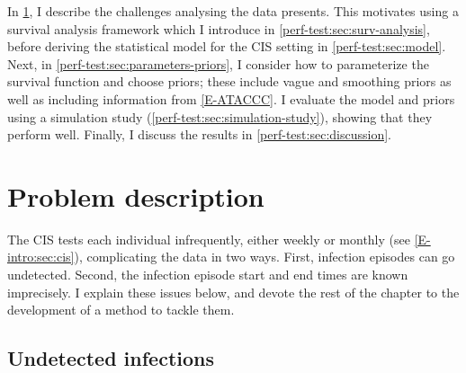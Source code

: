 \documentclass[thesis.tex]{subfiles}
\begin{document}
In \cref{perf-test:sec:problem}, I describe the challenges analysing the data presents.
This motivates using a survival analysis framework which I introduce in \cref{perf-test:sec:surv-analysis}, before deriving the statistical model for the CIS setting in \cref{perf-test:sec:model}.
Next, in \cref{perf-test:sec:parameters-priors}, I consider how to parameterize the survival function and choose priors; these include vague and smoothing priors as well as including information from \cref{E-ATACCC}.
I evaluate the model and priors using a simulation study (\cref{perf-test:sec:simulation-study}), showing that they perform well.
Finally, I discuss the results in \cref{perf-test:sec:discussion}.

\section{Problem description} \label{perf-test:sec:problem}

The CIS tests each individual infrequently, either weekly or monthly (see \cref{E-intro:sec:cis}), complicating the data in two ways.
First, infection episodes can go undetected.
Second, the infection episode start and end times are known imprecisely.
I explain these issues below, and devote the rest of the chapter to the development of a method to tackle  them.

\subsection{Undetected infections} \label{perf-test:sec:undetected}
\end{document}
